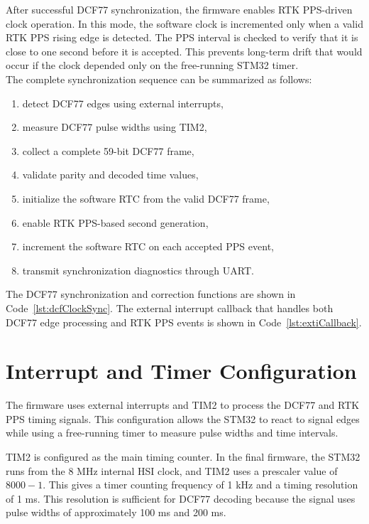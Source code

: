 After successful DCF77 synchronization, the firmware enables RTK PPS-driven clock operation. In this mode, the software clock is incremented only when a valid RTK PPS rising edge is detected. The PPS interval is checked to verify that it is close to one second before it is accepted. This prevents long-term drift that would occur if the clock depended only on the free-running STM32 timer.
\\
The complete synchronization sequence can be summarized as follows:
\begin{enumerate}
    \item detect DCF77 edges using external interrupts,
    \item measure DCF77 pulse widths using TIM2,
    \item collect a complete 59-bit DCF77 frame,
    \item validate parity and decoded time values,
    \item initialize the software RTC from the valid DCF77 frame,
    \item enable RTK PPS-based second generation,
    \item increment the software RTC on each accepted PPS event,
    \item transmit synchronization diagnostics through UART.
\end{enumerate}

The DCF77 synchronization and correction functions are shown in Code~\ref{lst:dcfClockSync}. The external interrupt callback that handles both DCF77 edge processing and RTK PPS events is shown in Code~\ref{lst:extiCallback}.

\section{Interrupt and Timer Configuration}

The firmware uses external interrupts and TIM2 to process the DCF77 and RTK PPS timing signals. This configuration allows the STM32 to react to signal edges while using a free-running timer to measure pulse widths and time intervals.

TIM2 is configured as the main timing counter. In the final firmware, the STM32 runs from the 8 MHz internal HSI clock, and TIM2 uses a prescaler value of $8000 - 1$. This gives a timer counting frequency of 1 kHz and a timing resolution of 1 ms. This resolution is sufficient for DCF77 decoding because the signal uses pulse widths of approximately 100 ms and 200 ms.

